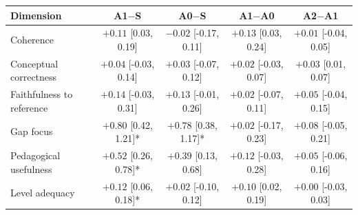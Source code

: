 \begin{tabular}{lcccc}
\toprule
Dimension & A1$-$S & A0$-$S & A1$-$A0 & A2$-$A1 \\
\midrule
Coherence & $+0.11$ [0.03, 0.19] & $-0.02$ [-0.17, 0.11] & $+0.13$ [0.03, 0.24] & $+0.01$ [-0.04, 0.05] \\
Conceptual correctness & $+0.04$ [-0.03, 0.14] & $+0.03$ [-0.07, 0.12] & $+0.02$ [-0.03, 0.07] & $+0.03$ [0.01, 0.07] \\
Faithfulness to reference & $+0.14$ [-0.03, 0.31] & $+0.13$ [-0.01, 0.26] & $+0.02$ [-0.07, 0.11] & $+0.05$ [-0.04, 0.15] \\
Gap focus & $+0.80$ [0.42, 1.21]* & $+0.78$ [0.38, 1.17]* & $+0.02$ [-0.17, 0.23] & $+0.08$ [-0.05, 0.21] \\
Pedagogical usefulness & $+0.52$ [0.26, 0.78]* & $+0.39$ [0.13, 0.68] & $+0.12$ [-0.03, 0.28] & $+0.05$ [-0.06, 0.16] \\
Level adequacy & $+0.12$ [0.06, 0.18]* & $+0.02$ [-0.10, 0.12] & $+0.10$ [0.02, 0.19] & $+0.00$ [-0.03, 0.03] \\
\bottomrule
\end{tabular}